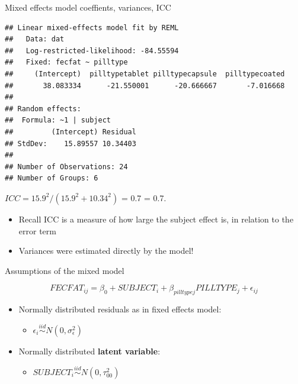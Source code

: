 \documentclass[
  ignorenonframetext,
]{beamer}
\providecommand{\tightlist}{%
  \setlength{\itemsep}{0pt}\setlength{\parskip}{0pt}}
\begin{document}
\begin{frame}[fragile]{Mixed effects model coeffients, variances, ICC}
\protect\hypertarget{mixed-effects-model-coeffients-variances-icc}{}

\tiny

\begin{verbatim}
## Linear mixed-effects model fit by REML
##   Data: dat 
##   Log-restricted-likelihood: -84.55594
##   Fixed: fecfat ~ pilltype 
##     (Intercept)  pilltypetablet pilltypecapsule  pilltypecoated 
##       38.083334      -21.550001      -20.666667       -7.016668 
## 
## Random effects:
##  Formula: ~1 | subject
##         (Intercept) Residual
## StdDev:    15.89557 10.34403
## 
## Number of Observations: 24
## Number of Groups: 6
\end{verbatim}

\(ICC = 15.9^2 / (15.9^2 + 10.34^2)\) = 0.7 = 0.7.

\normalsize

\begin{itemize}
\tightlist
\item
  Recall ICC is a measure of how large the subject effect is, in
  relation to the error term
\item
  Variances were estimated directly by the model!
\end{itemize}

\end{frame}

\begin{frame}{Assumptions of the mixed model}
\protect\hypertarget{assumptions-of-the-mixed-model}{}

\[
FECFAT_{ij} = \beta_0 + SUBJECT_i + \beta_{pilltype j} PILLTYPE_j + \epsilon_{ij}
\]

\begin{itemize}
\tightlist
\item
  Normally distributed residuals as in fixed effects model:

  \begin{itemize}
  \tightlist
  \item
    \(\epsilon_i \stackrel{iid}{\sim} N(0, \sigma_\epsilon^2)\)
  \end{itemize}
\item
  Normally distributed \textbf{latent variable}:

  \begin{itemize}
  \tightlist
  \item
    \(SUBJECT_i \stackrel{iid}{\sim} N(0, \tau_{00}^2)\)
  \end{itemize}
\end{itemize}

\end{frame}
\end{document}
